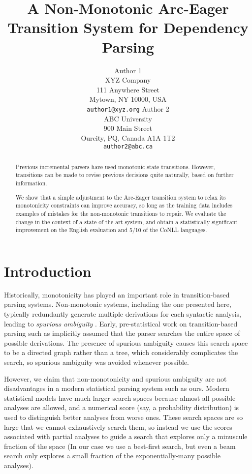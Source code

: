 \documentclass[11pt,letterpaper]{article}
\title{A Non-Monotonic Arc-Eager Transition System for Dependency Parsing}
\author{Author 1\\
	    XYZ Company\\
	    111 Anywhere Street\\
	    Mytown, NY 10000, USA\\
	    {\tt author1@xyz.org}
	  \And
	Author 2\\
  	ABC University\\
  	900 Main Street\\
  	Ourcity, PQ, Canada A1A 1T2\\
  {\tt author2@abc.ca}}
\date{}
\begin{document}
\maketitle
\begin{abstract}
    Previous incremental parsers have used monotonic state transitions.
    However, transitions can be made to revise
    previous decisions quite naturally, based on further information.

    We show that a simple adjustment to the Arc-Eager transition system to relax its
    monotonicity constraints can improve accuracy, so long as the training data
    includes examples of mistakes for the non-monotonic transitions to repair.
    We evaluate the change in the context of a state-of-the-art system, and
    obtain a statistically significant improvement on the English
    evaluation and 5/10 of the CoNLL languages.
\end{abstract}

\section{Introduction}


Historically, monotonicity has played an important role in transition-based parsing
systems.  Non-monotonic systems, including the one presented here, typically
redundantly generate multiple derivations for each syntactic analysis, leading to
{\em spurious ambiguity} \citep{Steedman00b}.  Early, pre-statistical work on transition-based
parsing such as \citet{Abney91} implicitly assumed that the parser searches the
entire space of possible derivations. The presence of spurious ambiguity causes
this search space to be a directed graph rather than a tree, which considerably
complicates the search, so spurious ambiguity was avoided whenever possible.

However, we claim that non-monotonicity and spurious ambiguity are not disadvantages in a
modern statistical parsing system such as ours.  Modern statistical models have
much larger search spaces because almost all possible analyses are allowed, and
a numerical score (say, a probability distribution) is used to distinguish better
analyses from worse ones.  These search spaces are so large that we cannot
exhaustively search them, so instead we use the scores associated with partial
analyses to guide a search that explores only a minuscule fraction of the space
(In our case we use a best-first search, but even a beam search only explores
a small fraction of the exponentially-many possible analyses).
\end{document}
